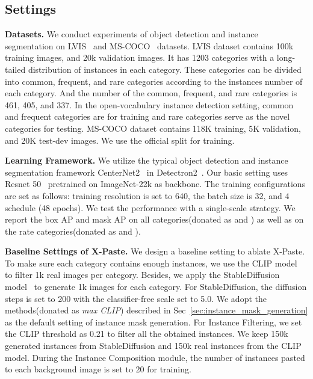 \documentclass{article}
\begin{document}
\subsection{Settings}
\noindent \textbf{Datasets.} We conduct experiments of object detection and instance segmentation on LVIS~\cite{LVIS} and MS-COCO~\cite{COCO} datasets. LVIS dataset contains 100k training images, and 20k validation images. It has 1203 categories with a long-tailed distribution of instances in each category. These categories can be  divided into common, frequent, and rare categories according to the instances number of each category. And the number of the common, frequent, and rare categories is 461, 405, and 337. In the open-vocabulary instance detection setting, common and frequent categories are for training and rare categories serve as the novel categories for testing. MS-COCO dataset contains 118K training, 5K validation, and 20K test-dev images. We use the official split for training. 

\noindent \textbf{Learning Framework.} We utilize the typical object detection and instance segmentation framework CenterNet2~\cite{CenterNet2} in Detectron2~\cite{wu2019detectron2}. Our basic setting uses Resnet 50~\cite{Resnet} pretrained on ImageNet-22k as backbone. The training configurations are set as follows: training resolution is set to 640, the batch size is 32, and 4 schedule (48 epochs). We test the performance with a single-scale strategy. We report the box AP and mask AP on all categories(donated as  and ) as well as on the rate categories(donated as  and ). 



\noindent \textbf{Baseline Settings of X-Paste.} We design a baseline setting to ablate X-Paste. To make sure each category contains enough instances, we use the CLIP model~\cite{CLIP} to filter 1k real images per category. Besides, we apply the StableDiffusion model~\cite{ldm} to generate 1k images for each category. For StableDiffusion, the diffusion steps is set to 200 with the classifier-free scale set to 5.0. We adopt the methods(donated as \emph{max CLIP}) described in Sec~\ref{sec:instance_mask_generation} as the default setting of instance mask generation. For Instance Filtering, we set the CLIP threshold as 0.21 to filter all the obtained instances. We keep 150k generated instances from StableDiffusion and 150k real instances from the CLIP model. During the Instance Composition module, the number of instances  pasted to each background image is set to 20 for training.
\end{document}
